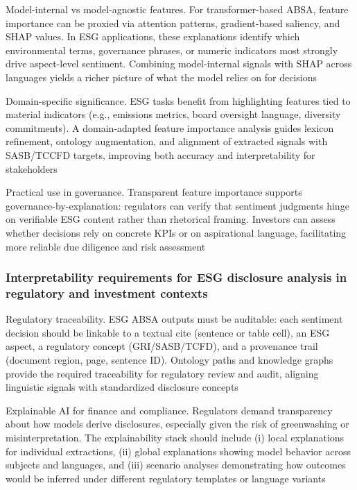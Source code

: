 Model-internal vs model-agnostic features. For transformer-based ABSA, feature importance can be proxied via attention patterns, gradient-based saliency, and SHAP values. In ESG applications, these explanations identify which environmental terms, governance phrases, or numeric indicators most strongly drive aspect-level sentiment. Combining model-internal signals with SHAP across languages yields a richer picture of what the model relies on for decisions \cite{10.1111/1475-679x.12575,10.3390/su11041093,10.18653/v1/2023.emnlp-main.975}

Domain-specific significance. ESG tasks benefit from highlighting features tied to material indicators (e.g., emissions metrics, board oversight language, diversity commitments). A domain-adapted feature importance analysis guides lexicon refinement, ontology augmentation, and alignment of extracted signals with SASB/TCCFD targets, improving both accuracy and interpretability for stakeholders \cite{10.1177/09726225241237304,10.1111/ejed.70225,10.1145/3503044}

Practical use in governance. Transparent feature importance supports governance-by-explanation: regulators can verify that sentiment judgments hinge on verifiable ESG content rather than rhetorical framing. Investors can assess whether decisions rely on concrete KPIs or on aspirational language, facilitating more reliable due diligence and risk assessment \cite{10.2139/ssrn.5130854,10.1002/csr.70116,10.1108/sampj-10-2020-0358}

\subsubsection{Interpretability requirements for ESG disclosure analysis in regulatory and investment contexts}

Regulatory traceability. ESG ABSA outputs must be auditable: each sentiment decision should be linkable to a textual cite (sentence or table cell), an ESG aspect, a regulatory concept (GRI/SASB/TCFD), and a provenance trail (document region, page, sentence ID). Ontology paths and knowledge graphs provide the required traceability for regulatory review and audit, aligning linguistic signals with standardized disclosure concepts \cite{10.1145/3503044,10.1111/1475-679x.12575,10.3390/su11041093}

Explainable AI for finance and compliance. Regulators demand transparency about how models derive disclosures, especially given the risk of greenwashing or misinterpretation. The explainability stack should include (i) local explanations for individual extractions, (ii) global explanations showing model behavior across subjects and languages, and (iii) scenario analyses demonstrating how outcomes would be inferred under different regulatory templates or language variants \cite{10.1002/csr.70089,10.2139/ssrn.3738629,10.1108/mf-01-2023-0020}

